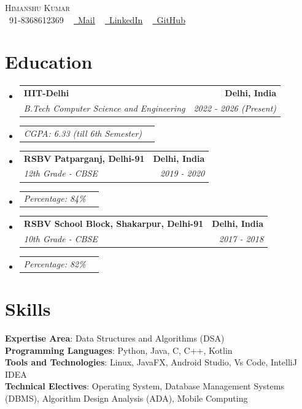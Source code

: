 \documentclass[letterpaper,11pt]{article}
\makeatletter
\newcommand{\resumeSubheading}[4]{
  \vspace{-2pt}\item
    \begin{tabular*}{1.0\textwidth}[t]{l@{\extracolsep{\fill}}r}
      \textbf{#1} & \textbf{\small #2} \\
      \textit{\small#3} & \textit{\small #4} \\
    \end{tabular*}\vspace{-7pt}
}
\newcommand{\resumeSubSubheading}[2]{
    \item
    \begin{tabular*}{0.97\textwidth}{l@{\extracolsep{\fill}}r}
      \textit{\small#1} & \textit{\small #2} \\
    \end{tabular*}\vspace{-7pt}
}
\newcommand{\resumeSubHeadingListStart}{\begin{itemize}[leftmargin=0.0in, label={}]}
\newcommand{\resumeSubHeadingListEnd}{\end{itemize}}
\makeatother
\begin{document}
\begin{center}
    {\Huge \scshape Himanshu Kumar} \\ \vspace{1pt}
    \small \raisebox{-0.1\height}\faPhone\ 91-8368612369 ~ \href{mailto:himanshu22215@iiitd.ac.in}{\raisebox{-0.2\height}\faEnvelope\  \underline{Mail}} ~ 
    \href{https://www.linkedin.com/in/himanshu-kumar-95626634b/}{\raisebox{-0.2\height}\faLinkedin\ \underline{LinkedIn}} ~
    \href{https://github.com/Himanshu8368}{\raisebox{-0.2\height}\faGithub\ \underline{GitHub}}
    \vspace{-8pt}
\end{center}

\section{Education}
  \resumeSubHeadingListStart
    \resumeSubheading
      {IIIT-Delhi}{Delhi, India}
      {B.Tech Computer Science and Engineering}{2022 - 2026 (Present)}
      \resumeSubSubheading{CGPA: 6.33 (till 6th Semester)}{}
      
    \resumeSubheading
      {RSBV Patparganj, Delhi-91}{Delhi, India}
      {12th Grade - CBSE}{2019 - 2020}
      \resumeSubSubheading{Percentage: 84\%}{}
      
    \resumeSubheading
      {RSBV School Block, Shakarpur, Delhi-91}{Delhi, India}
      {10th Grade - CBSE}{2017 - 2018}
      \resumeSubSubheading{Percentage: 82\%}{}
  \resumeSubHeadingListEnd


\section{Skills}
 \begin{itemize}[leftmargin=0.15in, label={}]
    \small{\item{
     \textbf{Expertise Area}{: Data Structures and Algorithms (DSA)} \\
     \textbf{Programming Languages}{: Python, Java, C, C++, Kotlin} \\
     \textbf{Tools and Technologies}{: Linux, JavaFX, Android Studio, Vs Code, IntelliJ IDEA} \\
     \textbf{Technical Electives}{: Operating System, Database Management Systems (DBMS), Algorithm Design Analysis (ADA), Mobile Computing}
    }}
 \end{itemize}
 \vspace{-16pt}
\end{document}
